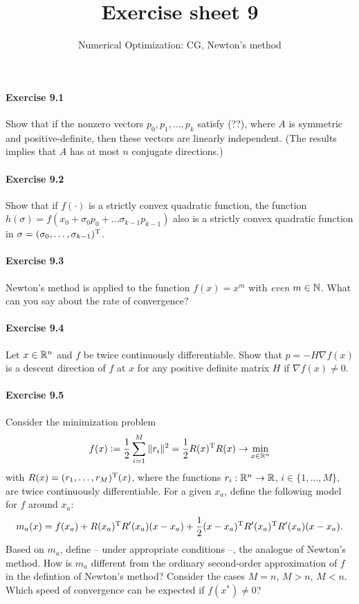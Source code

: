 
\title{Exercise sheet 9}
\subtitle{Numerical Optimization: CG, Newton's method}

\maketitle

\paragraph{Exercise 9.1}  %
Show that if the nonzero vectors $p_0, p_1,\dots, p_k$ satisfy (??), where $A$
is symmetric and positive-definite, then these vectors are linearly
independent. (The results implies that $A$ has at most $n$ conjugate
directions.)

\paragraph{Exercise 9.2}  %
Show that if $f(\cdot)$ is a strictly convex quadratic function, the function
$h(\sigma)=f(x_0+\sigma_0 p_0 + \dots \sigma_{k-1}p_{k-1})$ also is a strictly
convex quadratic function in $\sigma=(\sigma_0,\dots,\sigma_{k-1})^{\text{\upshape T}}$.

\paragraph{Exercise 9.3}
Newton's method is applied to the function $f(x)=x^m$ with \emph{even}
$m\in\mathbb{N}$. What can you say about the rate of convergence?

\paragraph{Exercise 9.4}
Let $x \in \mathbb{R}^n$ and $f$ be twice continuously differentiable. Show that $p =
-H\nabla f(x)$ is a descent direction of $f$ at $x$ for any positive definite
matrix $H$ if $\nabla f(x) \neq 0$.

\paragraph{Exercise 9.5}
Consider the minimization problem
\[
  f(x)\mathrel{\mathop:}= \frac{1}{2}\sum_{i=1}^M\|r_i\|^2 = \frac{1}{2}R(x)^{\text{\upshape T}} R(x) \to \min_{x\in\mathbb{R}^n}
\]
with $R(x)=(r_1,\dots,r_M)^{\text{\upshape T}}(x)$, where the functions $r_i:\mathbb{R}^n\to\mathbb{R}$, $i\in\{1,\dots,M\}$, are twice continuously differentiable. For a given $x_a$, define the following model for $f$ around $x_a$:
\[
  m_a(x) = f(x_a)
         + R(x_a)^{\text{\upshape T}} R'(x_a)(x-x_a)
         + \frac{1}{2} (x-x_a)^{\text{\upshape T}} R'(x_a)^{\text{\upshape T}} R'(x_a)(x-x_a).
\]
Based on $m_a$, define -- under appropriate conditions --, the analogue of Newton's method. How is $m_a$ different from the ordinary second-order approximation of $f$ in the defintion of Newton's method? Consider the cases $M=n$, $M>n$, $M<n$. Which speed of convergence can be expected if $f(x^*)\neq 0$?

